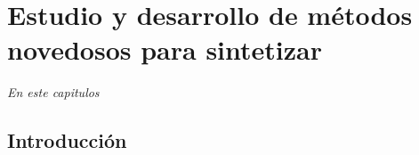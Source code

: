  \newcommand{\NoBiblioMeso}[1]{
 \ifthenelse{\equal{#1}{verdadero}}{}{}
 \NoBiblioMeso{verdadero}}

 
 \FormatoCapituloDosLineas
 
 \chapter{Estudio y desarrollo de métodos novedosos para sintetizar \pdm}
 \label{chap:Mesoporosos}

 \thispagestyle{empty}
	
 \noindent\textit{En este capitulos}
 
 
 \vfill
 \minitoc
 \newpage

\section{Introducción}

